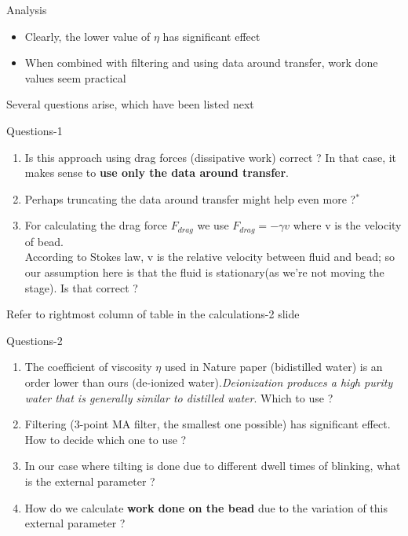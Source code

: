 \documentclass{beamer}
\begin{document}
\begin{frame}{Analysis}

\begin{itemize}
\item Clearly, the lower value of $\eta$ has significant effect
\item When combined with filtering and using data around transfer, work done values seem practical

\end{itemize}
Several questions arise, which have been listed next

\end{frame}

\begin{frame}{Questions-1}

\begin{enumerate}
\item Is this approach using drag forces (dissipative work) correct ? In that case, it makes sense to \textbf{use only the data around transfer}.
\item Perhaps truncating the data around transfer might help even more ?$^*$
\item For calculating the drag force $F_{drag}$ we use $F_{drag}=-\gamma v$ where v is the velocity of bead. \\
According to Stokes law, v is the relative velocity between fluid and bead; so our assumption here is that the fluid is stationary(as we're not moving the stage). Is that correct ?


\end{enumerate}
 \tiny{Refer to rightmost column of table in the calculations-2 slide}

\end{frame}
\begin{frame}{Questions-2}

\begin{enumerate}
\item The coefficient of viscosity $\eta$ used in Nature paper (bidistilled water) is an order lower than ours (de-ionized water).\textit{Deionization produces a high purity water that is generally similar to distilled water}. Which to use ?
\item Filtering (3-point MA filter, the smallest one possible) has significant effect. How to decide which one to use ?
\item In our case where tilting is done due to different dwell times of blinking, what is the external parameter ? 
\item How do we calculate \textbf{work done on the bead} due to the variation of this external parameter ?

\end{enumerate}


\end{frame}
\end{document}
